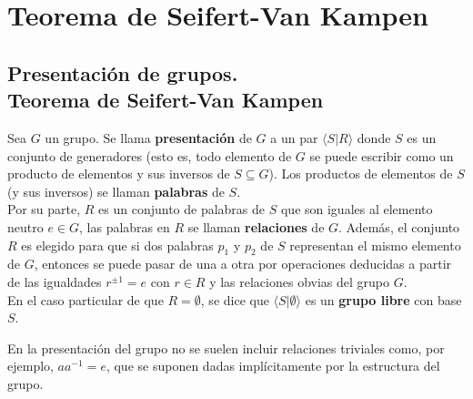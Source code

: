 \documentclass[GTS.tex]{subfiles}
\begin{document}
%
\renewcommand\chaptername{\Huge Tema}
%
\titleformat{\chapter}[display]
    {\normalfont\huge\bfseries}{\chaptertitlename\ \thechapter}{10pt}{\Huge}
\titlespacing*{\chapter}{0pt}{-1cm}{10pt}
%
%
%


\setcounter{chapter}{4}

\chapter{Teorema de Seifert-Van Kampen}
\section{Presentación de grupos.\\ Teorema de Seifert-Van Kampen}
\begin{defi}
Sea $G$ un grupo. Se llama \textbf{presentación} de $G$ a un par $\langle S|R\rangle$ donde $S$ es un conjunto de generadores (esto es, todo elemento de $G$ se puede escribir como un producto de elementos y sus inversos de $S\subseteq G$). Los productos de elementos de $S$ (y sus inversos) se llaman \textbf{palabras} de $S$.\\
Por su parte, $R$ es un conjunto de palabras de $S$ que son iguales al elemento neutro $e\in G$, las palabras en $R$ se llaman \textbf{relaciones} de $G$. Además, el conjunto $R$ es elegido para que si dos palabras $p_1$ y $p_2$ de $S$ representan el mismo elemento de $G$, entonces se puede pasar de una a otra por operaciones deducidas a partir de las igualdades $r^{\pm1} = e$ con $r\in R$ y las relaciones obvias del grupo $G$. \\
En el caso particular de que $R=\emptyset$, se dice que $\langle S|\emptyset\rangle$ es un \textbf{grupo libre} con base $S$.
\end{defi}

\begin{nota}
En la presentación del grupo no se suelen incluir relaciones triviales como, por ejemplo, $aa^{-1}=e$, que se suponen dadas implícitamente por la estructura del grupo.
\end{nota}
\end{document}
